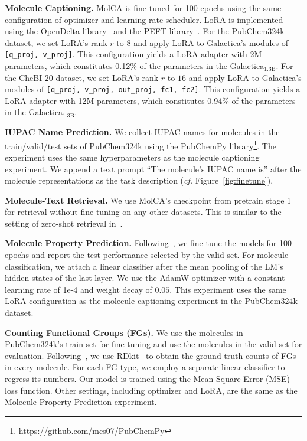 \documentclass[11pt]{article}
\newcommand{\cf}{\emph{cf. }}
\begin{document}
\textbf{Molecule Captioning.} MolCA is fine-tuned for 100 epochs using the same configuration of optimizer and learning rate scheduler. LoRA is implemented using the OpenDelta library~\cite{OpenDelta} and the PEFT library~\citep{peft}. For the PubChem324k dataset, we set LoRA's rank $r$ to $8$ and apply LoRA to Galactica's modules of \texttt{[q\_proj, v\_proj]}. This configuration yields a LoRA adapter with 2M parameters, which constitutes 0.12\% of the parameters in the Galactica$_{\text{1.3B}}$. For the CheBI-20 dataset, we set LoRA's rank $r$ to $16$ and apply LoRA to Galactica's modules of \texttt{[q\_proj, v\_proj, out\_proj, fc1, fc2]}. This configuration yields a LoRA adapter with 12M parameters, which constitutes 0.94\% of the parameters in the Galactica$_{\text{1.3B}}$.


\textbf{IUPAC Name Prediction.} We collect IUPAC names for molecules in the train/valid/test sets of PubChem324k using the PubChemPy library\footnote{\url{https://github.com/mcs07/PubChemPy}}. The experiment uses the same hyperparameters as the molecule captioning experiment. We append a text prompt ``The molecule's IUPAC name is'' after the molecule representations as the task description (\cf Figure~\ref{fig:finetune}). 

\textbf{Molecule-Text Retrieval.} We use MolCA's checkpoint from pretrain stage 1 for retrieval without fine-tuning on any other datasets. This is similar to the setting of zero-shot retrieval in~\cite{MoMu, MoleculeSTM}.


\textbf{Molecule Property Prediction.} Following~\cite{pretrain_gnn}, we fine-tune the models for 100 epochs and report the test performance selected by the valid set. For molecule classification, we attach a linear classifier after the mean pooling of the LM's hidden states of the last layer. We use the AdamW optimizer with a constant learning rate of 1e-4 and weight decay of $0.05$. This experiment uses the same LoRA configuration as the molecule captioning experiment in the PubChem324k dataset.

\textbf{Counting Functional Groups (FGs).} We use the molecules in PubChem324k's train set for fine-tuning and use the molecules in the valid set for evaluation.
Following~\cite{Grover}, we use RDkit~\cite{rdkit} to obtain the ground truth counts of FGs in every molecule. For each FG type, we employ a separate linear classifier to regress its numbers. Our model is trained using the Mean Square Error (MSE) loss function. Other settings, including optimizer and LoRA, are the same as the Molecule Property Prediction experiment.
\end{document}
